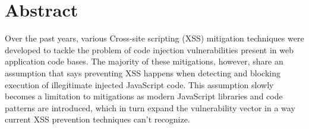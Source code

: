 \section*{Abstract}
		Over the past years, various Cross-site scripting (XSS) mitigation techniques were developed to tackle the problem of code injection vulnerabilities present in web application code bases.  The majority of these mitigations, however, share an assumption that says preventing XSS happens when detecting and blocking execution of illegitimate injected JavaScript code. This assumption slowly becomes a limitation to mitigations as modern JavaScript libraries and code patterns are introduced, which in turn expand the vulnerability vector in a way current XSS prevention techniques can’t recognize. 